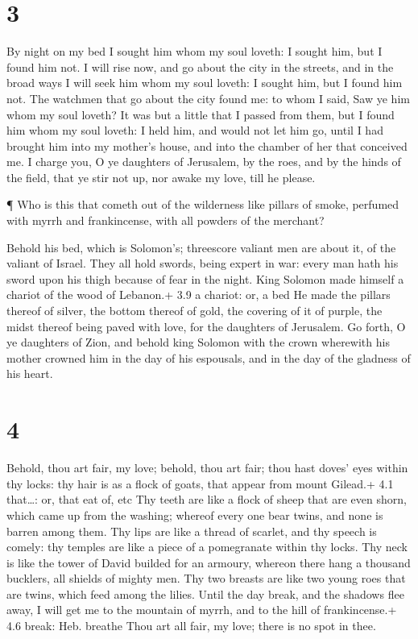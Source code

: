 \hypertarget{section-2}{%
\section{3}\label{section-2}}

 By night on my bed I sought him whom my soul loveth: I
sought him, but I found him not.  I will rise now, and go
about the city in the streets, and in the broad ways I will seek him
whom my soul loveth: I sought him, but I found him not.  The
watchmen that go about the city found me: to whom I said, Saw ye him
whom my soul loveth?  It was but a little that I passed from
them, but I found him whom my soul loveth: I held him, and would not let
him go, until I had brought him into my mother's house, and into the
chamber of her that conceived me.  I charge you, O ye
daughters of Jerusalem, by the roes, and by the hinds of the field, that
ye stir not up, nor awake my love, till he please.

 ¶ Who is this that cometh out of the wilderness like
pillars of smoke, perfumed with myrrh and frankincense, with all powders
of the merchant?

 Behold his bed, which is Solomon's; threescore valiant men
are about it, of the valiant of Israel.  They all hold
swords, being expert in war: every man hath his sword upon his thigh
because of fear in the night.  King Solomon made himself a
chariot of the wood of Lebanon.+ 3.9 a chariot: or, a bed 
He made the pillars thereof of silver, the bottom thereof of gold, the
covering of it of purple, the midst thereof being paved with love, for
the daughters of Jerusalem.  Go forth, O ye daughters of
Zion, and behold king Solomon with the crown wherewith his mother
crowned him in the day of his espousals, and in the day of the gladness
of his heart.

\hypertarget{section-3}{%
\section{4}\label{section-3}}

 Behold, thou art fair, my love; behold, thou art fair; thou
hast doves' eyes within thy locks: thy hair is as a flock of goats, that
appear from mount Gilead.+ 4.1 that\ldots: or, that eat of, etc
 Thy teeth are like a flock of sheep that are even shorn,
which came up from the washing; whereof every one bear twins, and none
is barren among them.  Thy lips are like a thread of
scarlet, and thy speech is comely: thy temples are like a piece of a
pomegranate within thy locks.  Thy neck is like the tower of
David builded for an armoury, whereon there hang a thousand bucklers,
all shields of mighty men.  Thy two breasts are like two
young roes that are twins, which feed among the lilies. 
Until the day break, and the shadows flee away, I will get me to the
mountain of myrrh, and to the hill of frankincense.+ 4.6 break: Heb.
breathe  Thou art all fair, my love; there is no spot in
thee.

